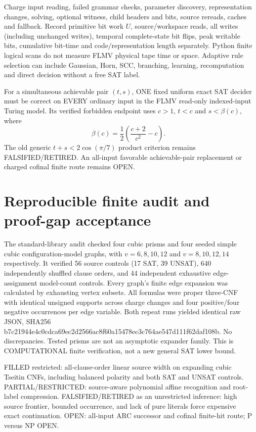 \documentclass[11pt]{article}
\begin{document}
Charge input reading, failed grammar checks, parameter discovery, representation changes, solving, optional witness, child headers and bits, source rereads, caches and fallback. Record primitive bit work $U$, source/workspace reads, all writes (including unchanged writes), temporal complete-state bit flips, peak writable bits, cumulative bit-time and code/representation length separately. Python finite logical scans do not measure FLMV physical tape time or space. Adaptive rule selection can include Gaussian, Horn, SCC, branching, learning, recomputation and direct decision without a free SAT label.

For a simultaneous achievable pair $(t,s)$, ONE fixed uniform exact SAT decider must be correct on EVERY ordinary input in the FLMV read-only indexed-input Turing model. Its verified forbidden endpoint uses $c>1$, $t<c$ and $s<\beta(c)$, where
\[
\beta(c)=\frac12\left(\frac{c+2}{c^2}-c\right).
\]
The old generic $t+s<2\cos(\pi/7)$ product criterion remains FALSIFIED/RETIRED. An all-input favorable achievable-pair replacement or charged cofinal finite route remains OPEN.

\section{Reproducible finite audit and proof-gap acceptance}
The standard-library audit checked four cubic prisms and four seeded simple cubic configuration-model graphs, with $v=6,8,10,12$ and $v=8,10,12,14$ respectively. It verified 56 source controls (17 SAT, 39 UNSAT), 640 independently shuffled clause orders, and 44 independent exhaustive edge-assignment model-count controls. Every graph's finite edge expansion was calculated by exhausting vertex subsets. All formulas were proper three-CNF with identical unsigned supports across charge changes and four positive/four negative occurrences per edge variable. Both repeat runs yielded identical raw JSON, SHA256 b7c21944e4c0cdca69ec2d2566ac8f60a15478ec3c764ae547d111f62daf108b. No discrepancies. Tested prisms are not an asymptotic expander family. This is COMPUTATIONAL finite verification, not a new general SAT lower bound.

FILLED restricted: all-clause-order linear source width on expanding cubic Tseitin CNFs, including balanced polarity and both SAT and UNSAT controls. PARTIAL/RESTRICTED: source-aware polynomial affine recognition and root-label compression. FALSIFIED/RETIRED as an unrestricted inference: high source frontier, bounded occurrence, and lack of pure literals force expensive exact continuation. OPEN: all-input ARC successor and cofinal finite-hit route; P versus NP OPEN.
\end{document}
